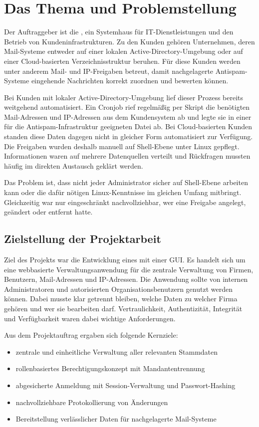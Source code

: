 \section{Das Thema und Problemstellung}
\label{sec:ThemaUndProblemstellung}
Der Auftraggeber ist die \betriebName{}, ein Systemhaus für IT-Dienstleistungen
und den Betrieb von Kundeninfrastrukturen. Zu den Kunden gehören Unternehmen,
deren Mail-Systeme entweder auf einer lokalen Active-Directory-Umgebung oder
auf einer Cloud-basierten Verzeichnisstruktur beruhen. Für diese Kunden werden
unter anderem Mail- und IP-Freigaben betreut, damit nachgelagerte
Antispam-Systeme eingehende Nachrichten korrekt zuordnen und bewerten können.

Bei Kunden mit lokaler Active-Directory-Umgebung lief dieser Prozess bereits
weitgehend automatisiert. Ein Cronjob rief regelmäßig per Skript die benötigten
Mail-Adressen und IP-Adressen aus dem Kundensystem ab und legte sie in einer
für die Antispam-Infrastruktur geeigneten Datei ab. Bei Cloud-basierten Kunden
standen diese Daten dagegen nicht in gleicher Form automatisiert zur Verfügung.
Die Freigaben wurden deshalb manuell auf Shell-Ebene unter Linux gepflegt.
Informationen waren auf mehrere Datenquellen verteilt und Rückfragen mussten
häufig im direkten Austausch geklärt werden.

Das Problem ist, dass nicht jeder Administrator sicher auf Shell-Ebene arbeiten
kann oder die dafür nötigen Linux-Kenntnisse im gleichen Umfang mitbringt.
Gleichzeitig war nur eingeschränkt nachvollziehbar, wer eine Freigabe angelegt,
geändert oder entfernt hatte.

\subsection{Zielstellung der Projektarbeit}
\label{sec:Zielstellung}
Ziel des Projekts war die Entwicklung eines
 mit einer GUI. Es handelt sich um eine
webbasierte Verwaltungsanwendung für die zentrale Verwaltung von Firmen,
Benutzern, Mail-Adressen und IP-Adressen. Die Anwendung sollte von internen
Administratoren und autorisierten Organisationsbenutzern genutzt werden können.
Dabei musste klar getrennt bleiben, welche Daten zu welcher Firma
gehören und wer sie bearbeiten darf. Vertraulichkeit, Authentizität,
Integrität und Verfügbarkeit waren dabei wichtige Anforderungen.

Aus dem Projektauftrag ergaben sich folgende Kernziele:
\begin{itemize}
  \item zentrale und einheitliche Verwaltung aller relevanten Stammdaten
  \item rollenbasiertes Berechtigungskonzept mit Mandantentrennung
  \item abgesicherte Anmeldung mit Session-Verwaltung und Passwort-Hashing
  \item nachvollziehbare Protokollierung von Änderungen
  \item Bereitstellung verlässlicher Daten für nachgelagerte Mail-Systeme
\end{itemize}


